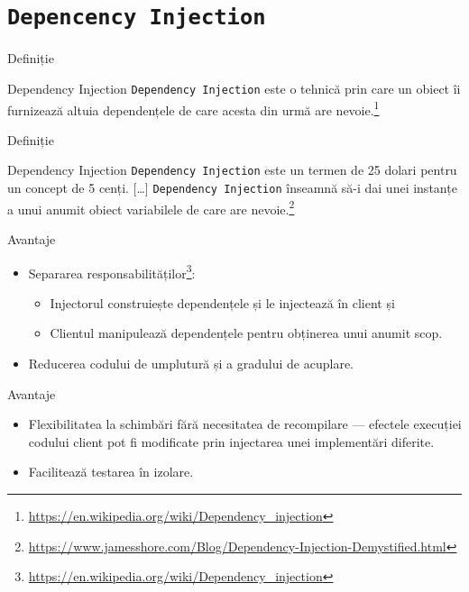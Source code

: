 \documentclass[presentation]{beamer}
\begin{document}
\section{\texttt{Depencency Injection}}
\label{sec:org5ac37ba}
\begin{frame}[label={sec:org0f53644},fragile]{Definiție}
 \begin{block}{Dependency Injection}
\texttt{Dependency Injection} este o tehnică prin care un obiect îi furnizează altuia dependențele de care acesta din urmă are nevoie.\footnote{\url{https://en.wikipedia.org/wiki/Dependency\_injection}}
\end{block}
\end{frame}
\begin{frame}[label={sec:org71fb2b7},fragile]{Definiție}
 \begin{block}{Dependency Injection}
\texttt{Dependency Injection} este un termen de 25 dolari pentru un concept de 5 cenți. [\ldots{}] \texttt{Dependency Injection} înseamnă să-i dai unei instanțe a unui anumit obiect variabilele de care are nevoie.\footnote{\url{https://www.jamesshore.com/Blog/Dependency-Injection-Demystified.html}}
\end{block}
\end{frame}
\begin{frame}[label={sec:orgd588dcf}]{Avantaje}
\begin{itemize}
\item Separarea responsabilităților\footnote{\url{https://en.wikipedia.org/wiki/Dependency\_injection}}:
\begin{itemize}
\item \alert{Injectorul} construiește dependențele și le injectează în client și
\item \alert{Clientul} manipulează dependențele pentru obținerea unui anumit scop.
\end{itemize}
\item Reducerea codului de umplutură și a gradului de acuplare.
\end{itemize}
\end{frame}
\begin{frame}[label={sec:org33c883a}]{Avantaje}
\begin{itemize}
\item Flexibilitatea la schimbări fără necesitatea de recompilare --- efectele execuției codului client pot fi modificate prin injectarea unei implementări diferite.
\item Facilitează testarea în izolare.
\end{itemize}
\end{frame}
\end{document}
